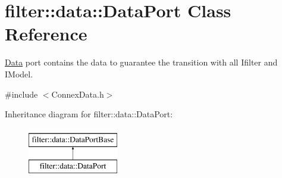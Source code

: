 \hypertarget{classfilter_1_1data_1_1_data_port}{}\section{filter\+:\+:data\+:\+:Data\+Port Class Reference}
\label{classfilter_1_1data_1_1_data_port}


\hyperlink{classfilter_1_1data_1_1_data}{Data} port contains the data to guarantee the transition with all Ifilter and I\+Model.  




{\ttfamily \#include $<$Connex\+Data.\+h$>$}

Inheritance diagram for filter\+:\+:data\+:\+:Data\+Port\+:\begin{figure}[H]
\begin{center}
\leavevmode
\includegraphics[height=2.000000cm]{d0/d37/classfilter_1_1data_1_1_data_port}
\end{center}
\end{figure}

